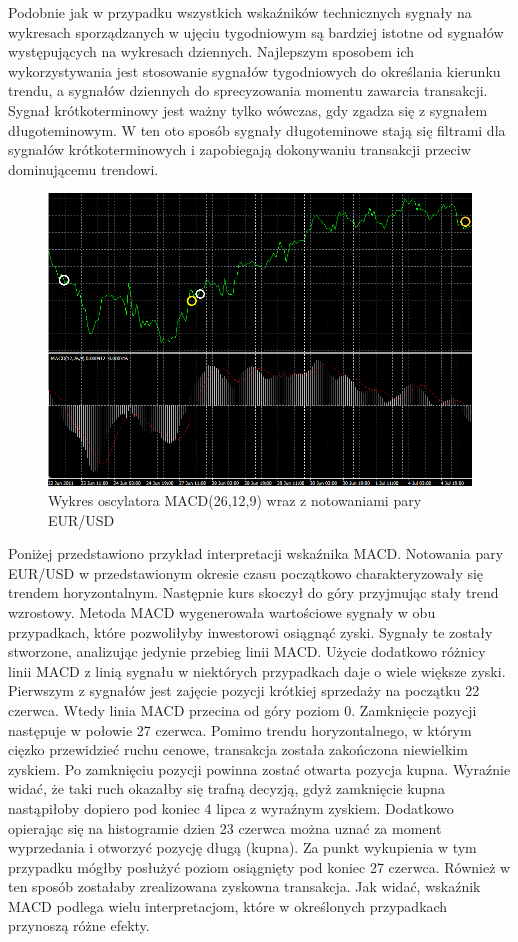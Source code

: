 \documentclass[pdflatex,11pt]{aghdpl}
\begin{document}
Podobnie jak w przypadku wszystkich wskaźników technicznych sygnały na wykresach sporządzanych w ujęciu tygodniowym są bardziej istotne od sygnałów występujących na wykresach dziennych. Najlepszym sposobem ich wykorzystywania jest stosowanie sygnałów tygodniowych do określania kierunku trendu, a sygnałów dziennych do sprecyzowania momentu zawarcia transakcji. Sygnał krótkoterminowy jest ważny tylko wówczas, gdy zgadza się z sygnałem długoteminowym. W ten oto sposób sygnały długoteminowe stają się filtrami dla sygnałów krótkoterminowych i zapobiegają dokonywaniu transakcji przeciw dominującemu trendowi\cite{5}.
\begin{figure}[ht]
\begin{center}
\includegraphics[width=15cm]{macd.png}
\caption{Wykres oscylatora MACD(26,12,9) wraz z notowaniami pary EUR/USD}
\label{macd}
\end{center}
\end{figure}

Poniżej przedstawiono przykład interpretacji wskaźnika MACD. Notowania pary EUR/USD w przedstawionym okresie czasu początkowo charakteryzowały się trendem horyzontalnym. Następnie kurs skoczył do góry przyjmując stały trend wzrostowy. Metoda MACD wygenerowała wartościowe sygnały w obu przypadkach, które pozwoliłyby inwestorowi osiągnąć zyski. Sygnały te zostały stworzone, analizując jedynie przebieg linii MACD. Użycie dodatkowo różnicy linii MACD z linią sygnału w niektórych przypadkach daje o wiele większe zyski. Pierwszym z sygnałów jest zajęcie pozycji krótkiej sprzedaży na początku 22 czerwca. Wtedy linia MACD przecina od góry poziom 0. Zamknięcie pozycji następuje w połowie 27 czerwca. Pomimo trendu horyzontalnego, w którym cięzko przewidzieć ruchu cenowe, transakcja została zakończona niewielkim zyskiem. Po zamknięciu pozycji powinna zostać otwarta pozycja kupna. Wyraźnie widać, że taki ruch okazałby się trafną decyzją, gdyż zamknięcie kupna nastąpiłoby dopiero pod koniec 4 lipca z wyraźnym zyskiem. Dodatkowo opierając się na histogramie dzien 23 czerwca można uznać za moment wyprzedania i otworzyć pozycję długą (kupna). Za punkt wykupienia w tym przypadku mógłby posłużyć poziom osiągnięty pod koniec 27 czerwca. Również w ten sposób zostałaby zrealizowana zyskowna transakcja. Jak widać, wskaźnik MACD podlega wielu interpretacjom, które w określonych przypadkach przynoszą różne efekty. 
\end{document}
